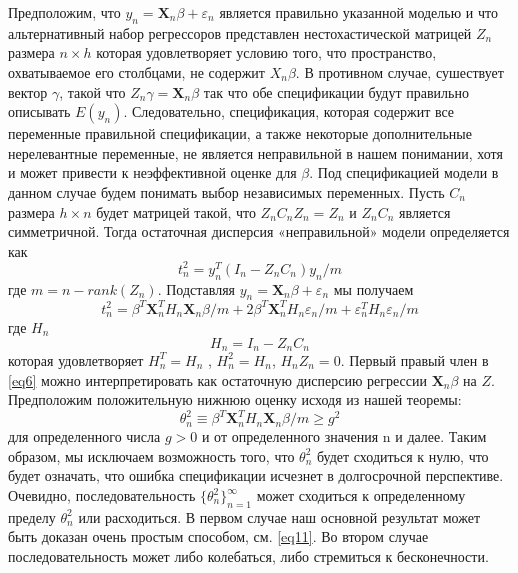 \documentclass[12pt, twoside]{article}
\newcommand{\X}{\mathbf{X}}
\theoremstyle{definition}
\begin{document}
Предположим, что $y_n = \X_n\beta+\varepsilon_n$ является правильно указанной моделью и что альтернативный набор регрессоров представлен нестохастической матрицей $Z_n$ размера $n\times h$ которая удовлетворяет условию того, что пространство, охватываемое его столбцами, не содержит $X_n\beta$. В противном случае, сушествует вектор $\gamma$, такой что $Z_n\gamma = \X_n\beta$ так что обе спецификации будут правильно описывать $E(y_n)$. Следовательно, спецификация, которая содержит все переменные правильной спецификации, а также некоторые дополнительные нерелевантные переменные, не является неправильной в нашем понимании, хотя и может привести к неэффективной оценке для $\beta$. Под спецификацией модели в данном случае будем понимать выбор независимых переменных. Пусть $C_n$ размера $h\times n$ будет матрицей такой, что $Z_n C_n Z_n = Z_n$ и $Z_n C_n$ является симметричной. Тогда остаточная дисперсия «неправильной» модели определяется как
\begin{equation}\label{eq5}
t_n^2 = y_n^{T}(I_n - Z_n C_n)y_n/m
\end{equation}
где $m = n -rank(Z_n)$. Подставляя $y_n = \X_n\beta+\varepsilon_n$ мы получаем 
\begin{equation}\label{eq6}
t_n^2 = \beta^{T}\X_n^{T}H_n\X_n\beta/m +2\beta^{T}\X_n^{T}H_n \varepsilon_n/m +\varepsilon_n^{T}H_n\varepsilon_n/m
\end{equation}
где $H_n$ 
\begin{equation}\label{eq7}
H_n = I_n - Z_n C_n
\end{equation}
которая удовлетворяет $H_n^{T} = H_n$ , $H_n^2 = H_n$, $H_n Z_n = 0$. Первый правый член в \eqref{eq6} можно интерпретировать как остаточную дисперсию регрессии $\X_n \beta$ на $Z$. Предположим положительную нижнюю оценку исходя из нашей теоремы:
\begin{equation}\label{eq8}
\theta_n^2 \equiv \beta^{T} \X_n^{T} H_n \X_n \beta/m \geq g^2
\end{equation}
для определенного числа $g>0$ и от определенного значения n и далее. Таким образом, мы исключаем возможность того, что $\theta_n^2$ будет сходиться к нулю, что будет означать, что ошибка спецификации исчезнет в долгосрочной перспективе. Очевидно, последовательность $\{\theta_n^2\}_{n=1}^{\infty}$ может сходиться к определенному пределу $\theta_n^2$ или расходиться. В первом случае наш основной результат может быть доказан очень простым способом, см. \eqref{eq11}. Во втором случае последовательность может либо колебаться, либо стремиться к бесконечности. 
\end{document}
